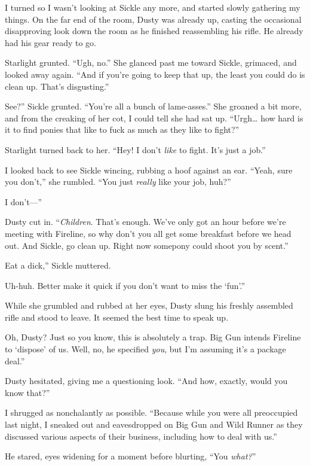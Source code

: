 I turned so I wasn’t looking at Sickle any more, and started slowly gathering my things. On the far end of the room, Dusty was already up, casting the occasional disapproving look down the room as he finished reassembling his rifle. He already had his gear ready to go.

Starlight grunted. “Ugh, no.” She glanced past me toward Sickle, grimaced, and looked away again. “And if you’re going to keep that up, the least you could do is clean up. That’s disgusting.”

\leavevmode{}See?” Sickle grunted. “You’re all a bunch of lame-asses.” She groaned a bit more, and from the creaking of her cot, I could tell she had sat up. “Urgh… how hard is it to find ponies that like to fuck as much as they like to fight?”

Starlight turned back to her. “Hey! I don’t \textit{like} to fight. It’s just a job.”

I looked back to see Sickle wincing, rubbing a hoof against an ear. “Yeah, sure you don’t,” she rumbled. “You just \textit{really} like your job, huh?”

\leavevmode{}I don’t—”

Dusty cut in. “\textit{Children}. That’s enough. We’ve only got an hour before we’re meeting with Fireline, so why don’t you all get some breakfast before we head out. And Sickle, go clean up. Right now somepony could shoot you by scent.”

\leavevmode{}Eat a dick,” Sickle muttered.

\leavevmode{}Uh-huh. Better make it quick if you don’t want to miss the ‘fun’.”

While she grumbled and rubbed at her eyes, Dusty slung his freshly assembled rifle and stood to leave. It seemed the best time to speak up.

\leavevmode{}Oh, Dusty? Just so you know, this is absolutely a trap. Big Gun intends Fireline to ‘dispose’ of us. Well, no, he specified \textit{you}, but I’m assuming it’s a package deal.”

Dusty hesitated, giving me a questioning look. “And how, exactly, would you know that?”

I shrugged as nonchalantly as possible. “Because while you were all preoccupied last night, I sneaked out and eavesdropped on Big Gun and Wild Runner as they discussed various aspects of their business, including how to deal with us.”

He stared, eyes widening for a moment before blurting, “You \textit{what?}”

